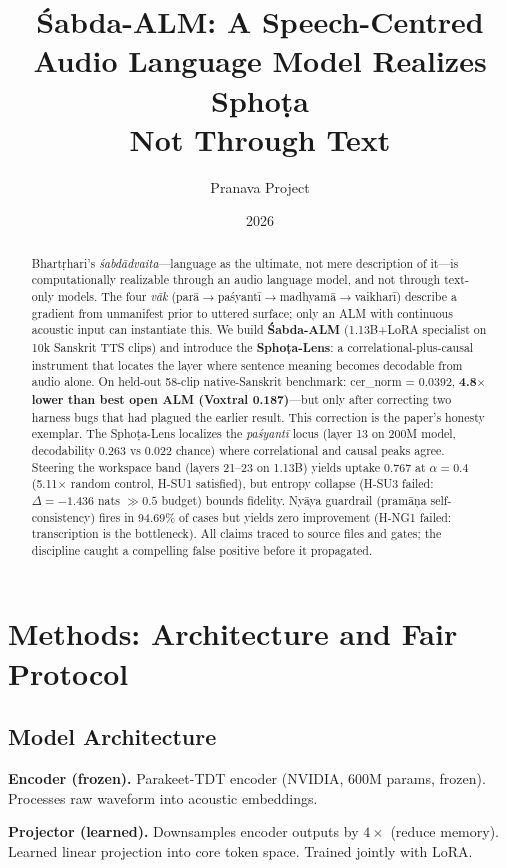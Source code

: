 \documentclass[11pt]{article}
\title{\textbf{Śabda-ALM: A Speech-Centred Audio Language Model Realizes Sphoṭa\\
Not Through Text}}
\author{Pranava Project}
\date{2026}
\begin{document}
\maketitle

\begin{abstract}
Bhartṛhari's \emph{śabdādvaita}---language as the ultimate, not mere description of it---is computationally realizable through an audio language model, and not through text-only models. The four \emph{vāk} (parā$\to$paśyantī$\to$madhyamā$\to$vaikharī) describe a gradient from unmanifest prior to uttered surface; only an ALM with continuous acoustic input can instantiate this. We build \textbf{Śabda-ALM} (1.13B+LoRA specialist on 10k Sanskrit TTS clips) and introduce the \textbf{Sphoṭa-Lens}: a correlational-plus-causal instrument that locates the layer where sentence meaning becomes decodable from audio alone. On held-out 58-clip native-Sanskrit benchmark: cer\_norm = 0.0392, \textbf{4.8$\times$ lower than best open ALM (Voxtral 0.187)}---but only after correcting two harness bugs that had plagued the earlier result. This correction is the paper's honesty exemplar. The Sphoṭa-Lens localizes the \emph{paśyantī} locus (layer 13 on 200M model, decodability 0.263 vs 0.022 chance) where correlational and causal peaks agree. Steering the workspace band (layers 21--23 on 1.13B) yields uptake 0.767 at $\alpha=0.4$ (5.11$\times$ random control, H-SU1 satisfied), but entropy collapse (H-SU3 failed: $\Delta=-1.436$ nats $\gg 0.5$ budget) bounds fidelity. Nyāya guardrail (pramāṇa self-consistency) fires in 94.69\% of cases but yields zero improvement (H-NG1 failed: transcription is the bottleneck). All claims traced to source files and gates; the discipline caught a compelling false positive before it propagated.
\end{abstract}

\section{Methods: Architecture and Fair Protocol}

\subsection{Model Architecture}

\textbf{Encoder (frozen).} Parakeet-TDT encoder (NVIDIA, 600M params, frozen). Processes raw waveform into acoustic embeddings.

\textbf{Projector (learned).} Downsamples encoder outputs by $4\times$ (reduce memory). Learned linear projection into core token space. Trained jointly with LoRA.
\end{document}
